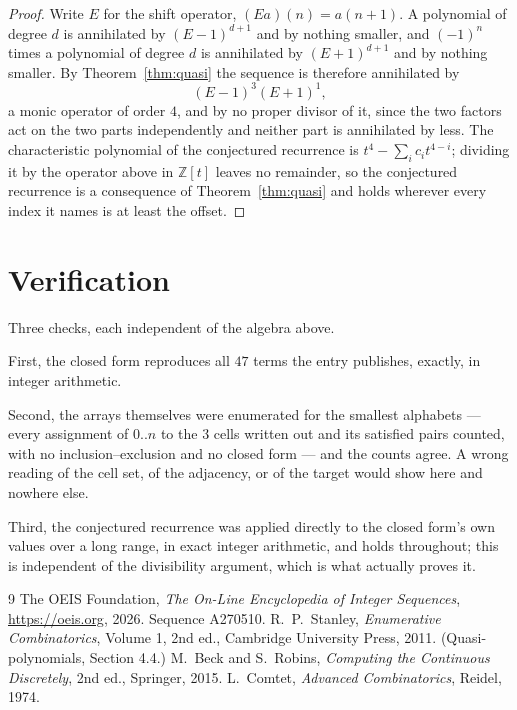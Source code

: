 \documentclass[11pt,a4paper]{article}
\theoremstyle{plain}
\theoremstyle{definition}
\begin{document}
\begin{proof}
Write $E$ for the shift operator, $(Ea)(n)=a(n+1)$. A polynomial of degree $d$ is annihilated
by $(E-1)^{d+1}$ and by nothing smaller, and $(-1)^n$ times a polynomial of degree $d$ is
annihilated by $(E+1)^{d+1}$ and by nothing smaller. By Theorem~\ref{thm:quasi} the
sequence is therefore annihilated by
\[
(E-1)^{3}(E+1)^{1},
\]
a monic operator of order $4$, and by no proper divisor of it, since the two
factors act on the two parts independently and neither part is annihilated by less. The
characteristic polynomial of the conjectured recurrence is
$t^{4}-\sum_i c_it^{4-i}$; dividing it by the operator above in
$\mathbb{Z}[t]$ leaves no remainder, so the conjectured recurrence is a consequence of
Theorem~\ref{thm:quasi} and holds wherever every index it names is at least the offset.
\end{proof}

\section{Verification}

Three checks, each independent of the algebra above.

First, the closed form reproduces all $47$ terms the entry publishes, exactly, in integer
arithmetic.

Second, the arrays themselves were enumerated for the smallest alphabets --- every assignment
of $0..n$ to the $3$ cells written out and its satisfied pairs counted, with no
inclusion--exclusion and no closed form --- and the counts agree. A wrong reading of the cell
set, of the adjacency, or of the target would show here and nowhere else.

Third, the conjectured recurrence was applied directly to the closed form's own values over a
long range, in exact integer arithmetic, and holds throughout; this is independent of the
divisibility argument, which is what actually proves it.

\begin{thebibliography}{9}
 The OEIS Foundation, \emph{The On-Line Encyclopedia of Integer
Sequences}, \url{https://oeis.org}, 2026. Sequence A270510.
 R.~P.~Stanley, \emph{Enumerative Combinatorics}, Volume 1, 2nd ed.,
Cambridge University Press, 2011. (Quasi-polynomials, Section 4.4.)
 M.~Beck and S.~Robins, \emph{Computing the Continuous Discretely}, 2nd ed.,
Springer, 2015.
 L.~Comtet, \emph{Advanced Combinatorics}, Reidel, 1974.
\end{thebibliography}
\end{document}
